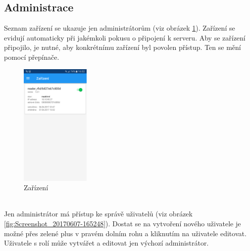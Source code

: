 \documentclass[czech,BP]{thesiskiv}
\begin{document}
\subsection{Administrace}
Seznam zařízení se ukazuje jen administrátorům (viz obrázek \ref{fig:Screenshot_20170607-165221}). Zařízení se evidují automaticky při jakémkoli pokusu o připojení k serveru. Aby se zařízení připojilo, je nutné, aby konkrétnímu zařízení byl povolen přístup. Ten se mění pomocí přepínače.
\begin{figure}[H]
	\centering
	\includegraphics[width=0.3\textwidth]{../images/client_android/Screenshot_20170607-165221.png}	
	\caption{Zařízení}
	\label{fig:Screenshot_20170607-165221}
\end{figure}
\ \\
Jen administrátor má přístup ke správě uživatelů (viz obrázek \ref{fig:Screenshot_20170607-165248}).
Dostat se na vytvoření nového uživatele je možné přes zelené plus v pravém dolním rohu a kliknutím na uživatele editovat.
Uživatele s rolí  může vytvářet a editovat jen výchozí administrátor.
\end{document}
